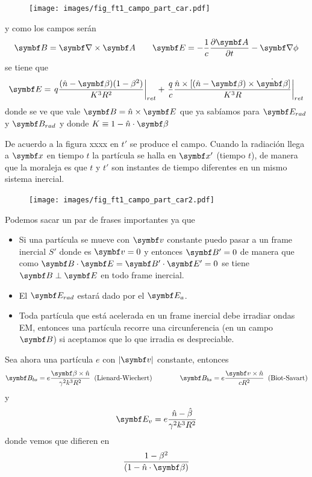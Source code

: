 \documentclass[10pt,oneside]{CBFT_book}
\begin{document}
\begin{figure}[htb]
	\begin{center}
	\texttt{[image: images/fig\_ft1\_campo\_part\_car.pdf]}	 
	\end{center}
	\caption{}
\end{figure} 

y como los campos serán 
\[
	\vb{B} = \rotorm{A} \qquad \vb{E} = -\frac{1}{c}\dpar{\vb{A}}{t} - \Nabla\phi
\]
se tiene que 
\[
	\vb{E} = \left. q \frac{ (\hat{n}-\vb{\beta})(1-\beta^2)}{K^3R^2} \right|_{ret} + \left. 
	\frac{q}{c} \frac{\hat{n}\times[ (\hat{n}-\vb{\beta})\times \dot{\vb{\beta}} ]}{K^3R} \right|_{ret}
\]
donde se ve que vale $\vb{B} = \hat{n} \times \vb{E}$ que ya sabíamos para $\vb{E}_{rad}$ y $\vb{B}_{rad}$
y donde $K\equiv 1 - \hat{n}\cdot\vb{\beta} $

De acuerdo a la figura xxxx en $t'$ se produce el campo. Cuando la radiación llega a $\vb{x}$ en tiempo $t$ 
la partícula se halla en $\vb{x}'$ (tiempo $t$), de manera que la moraleja es que $t$ y $t'$ son instantes
de tiempo diferentes en un mismo sistema inercial.

\begin{figure}[htb]
	\begin{center}
	\texttt{[image: images/fig\_ft1\_campo\_part\_car2.pdf]}	 
	\end{center}
	\caption{}
\end{figure} 

Podemos sacar un par de frases importantes ya que 
\begin{itemize}
 \item Si una partícula se mueve con $\vb{v}$ constante puedo pasar a un frame inercial $S'$ donde es 
 $\vb{v}=0$ y entonces $\vb{B}'=0$ de manera que como $\pe{B}{E}=\pe{B'}{E'}=0$ se tiene $\vb{B}\perp\vb{E}$
 en todo frame inercial.
 \item El $\vb{E}_{rad}$ estará dado por el $\vb{E}_a$.
 \item Toda partícula que está acelerada en un frame inercial debe irradiar ondas EM, entonces una partícula
 recorre una circunferencia (en un campo $\vb{B}$) si aceptamos que lo que irradia es despreciable.
\end{itemize}

Sea ahora una partícula $e$ con $|\vb{v}|$ constante, entonces 
\[
	\vb{B}_{bs} = e\frac{\vb{\beta}\times\hat{n}}{\gamma^2k^3R^2} \;\; \text{(Lienard-Wiechert)}
	\qquad \qquad 
	\vb{B}_{bs} = e\frac{\vb{v}\times\hat{n}}{cR^2} \;\; \text{(Biot-Savart)}
\]
y 
\[
	\vb{E}_{v} = e\frac{ \hat{n}- \hat{\beta} }{\gamma^2k^3R^2}
\]
donde vemos que difieren en 
\[
	\frac{1-\beta^2}{(1-\hat{n}\cdot{\vb{\beta}})}
\]
\end{document}
